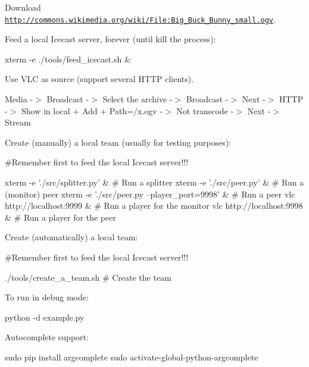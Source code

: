 \begin{DoxyItemize}
\item Download \href{http://commons.wikimedia.org/wiki/File:Big_Buck_Bunny_small.ogv}{\tt http\+://commons.\+wikimedia.\+org/wiki/\+File\+:\+Big\+\_\+\+Buck\+\_\+\+Bunny\+\_\+small.\+ogv}.
\item Feed a local Icecast server, forever (until kill the process)\+:

xterm -\/e \textquotesingle{}./tools/feed\+\_\+icecast.sh\textquotesingle{} \&
\item Use V\+L\+C as source (support several H\+T\+T\+P clients).

Media -\/$>$ Broadcast -\/$>$ Select the archive -\/$>$ Broadcast -\/$>$ Next -\/$>$ H\+T\+T\+P -\/$>$ Show in local + Add + Path=/x.ogv -\/$>$ Not transcode -\/$>$ Next -\/$>$ Stream
\item Create (manually) a local team (usually for testing purposes)\+:

\#\+Remember first to feed the local Icecast server!!! \begin{DoxyVerb}   xterm -e './src/splitter.py' &                # Run a splitter
   xterm -e './src/peer.py' &                    # Run a (monitor) peer
   xterm -e './src/peer.py --player_port=9998' & # Run a peer
   vlc http://localhost:9999 &                   # Run a player for the monitor
   vlc http://localhost:9998 &                   # Run a player for the peer
\end{DoxyVerb}

\item Create (automatically) a local team\+:

\#\+Remember first to feed the local Icecast server!!! \begin{DoxyVerb}./tools/create_a_team.sh # Create the team
\end{DoxyVerb}

\item To run in debug mode\+: \begin{DoxyVerb}  python -d example.py
\end{DoxyVerb}

\item Autocomplete support\+: \begin{DoxyVerb}  sudo pip install argcomplete
  sudo activate-global-python-argcomplete\end{DoxyVerb}
 
\end{DoxyItemize}